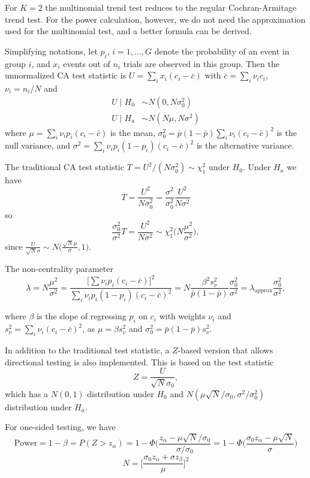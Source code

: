 \documentclass[reqno]{amsart}
\begin{document}
For $K=2$ the multinomial trend test reduces to the regular Cochran-Armitage trend test. For the power calculation, however, we do not need the approximation used for the multinomial test, and a better formula can be derived.

Simplifying notations, let $p_i$, $i=1,\ldots,G$ denote the probability of an event in group $i$, and $x_i$ events out of $n_i$ trials are observed in this group. Then the unnormalized CA test statistic is $U = \sum_i x_i(c_i - \bar{c})$ with $\bar{c}=\sum_i \nu_i c_i$, $\nu_i = n_i/N$ and
\begin{align*}
U \mid H_0 &\sim N(0, N\sigma^2_0) \\
U \mid H_a &\sim N(N\mu, N\sigma^2) 
\end{align*}
where $\mu = \sum_i \nu_i p_i(c_i - \bar{c})$ is the mean, $\sigma^2_0 = \bar{p}(1-\bar{p})\sum_i \nu_i(c_i - \bar{c})^2$ is the null variance, and $\sigma^2 = \sum_i \nu_ip_i(1-p_i)(c_i - \bar{c})^2$
is the alternative variance.

The traditional CA test statistic $T = U^2 \big/ (N\sigma_0^2) \sim \chi^2_1$ under $H_0$. Under $H_a$ we have 
$$T = \frac{U^2}{N\sigma_0^2} =  \frac{\sigma^2}{\sigma_0^2}  \frac{U^2}{N\sigma^2} $$
so $$\frac{\sigma_0^2}{\sigma^2} T = \frac{U^2}{N\sigma^2} \sim \chi^2_1\Big(N\frac{\mu^2}{\sigma^2}\Big),$$
since $\frac{U}{\sqrt{N}\sigma} \sim N\Big( \frac{\sqrt{N}\mu}{\sigma}, 1\Big)$.

The non-centrality parameter $$\lambda = N\frac{\mu^2}{\sigma^2} = \frac{\big[\sum{\nu_i p_i (c_i - \bar{c})\big]^2}}{\sum_i\nu_i p_i(1-p_i)(c_i-\bar{c})^2} =
N \frac{\beta^2 s^2_{\nu}}{\bar{p}(1-\bar{p})} \frac{\sigma_0^2}{\sigma^2} = 
\lambda_\text{approx} \frac{\sigma_0^2}{\sigma^2},$$

where $\beta$ is the slope of regressing $p_i$ on $c_i$ with weights $\nu_i$ and $s^2_\nu = \sum_i \nu_i(c_i - \bar{c})^2$, as $\mu=\beta s^2_{\nu}$ and $\sigma_0^2 = \bar{p}(1-\bar{p})s^2_{\nu}$.

In addition to the traditional test statistic, a $Z$-based version that allows directional testing is also implemented.
This is based on the test statistic
$$ Z = \frac{U}{\sqrt{N}\sigma_0}, $$
which has a $N(0,1)$ distribution under $H_0$ and $N(\mu\sqrt{N}/\sigma_0, \sigma^2/\sigma_0^2)$ distribution under $H_a$.

For one-sided testing, we have
$$ \text{Power} = 1-\beta = P(Z > z_\alpha) = 1 - \Phi\Big(\frac{z_\alpha - \mu\sqrt{N} / \sigma_0}{\sigma / \sigma_0}
=1 - \Phi\Big(\frac{ \sigma_0 z_\alpha - \mu\sqrt{N} }{\sigma}\Big)$$
$$N = \Big[\frac{ \sigma_0 z_\alpha + \sigma z_{\beta}}{\mu}\Big]^2$$
\end{document}
